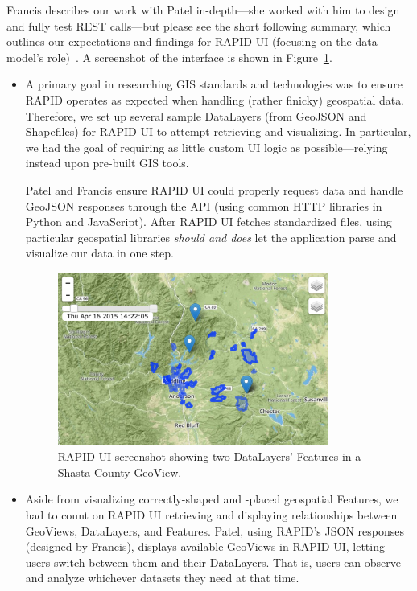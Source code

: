Francis describes our work with Patel in-depth---she worked with him to design and fully test REST calls---but please see the short following summary, which outlines our expectations and findings for RAPID UI (focusing on the data model's role)~\cite{Francis}. A screenshot of the interface is shown in Figure~\ref{fig:rapidui}.

\begin{itemize}
\item A primary goal in researching GIS standards and technologies was to ensure RAPID operates as expected when handling (rather finicky) geospatial data. Therefore, we set up several sample DataLayers (from GeoJSON and Shapefiles) for RAPID UI to attempt retrieving and visualizing. In particular, we had the goal of requiring as little custom UI logic as possible---relying instead upon pre-built GIS tools.

Patel and Francis ensure RAPID UI could properly request data and handle GeoJSON responses through the API (using common HTTP libraries in Python and JavaScript). After RAPID UI fetches standardized files, using particular geospatial libraries \textit{should and does} let the application parse and visualize our data in one step.

\begin{figure}[ht]
    \centering
    \includegraphics[width=0.84\textwidth]{figures/rapidui.png}
    \caption{RAPID UI screenshot showing two DataLayers' Features in a Shasta County GeoView.}
    \label{fig:rapidui}
\end{figure}

\item Aside from visualizing correctly-shaped and -placed geospatial Features, we had to count on RAPID UI retrieving and displaying relationships between GeoViews, DataLayers, and Features. Patel, using RAPID's JSON responses (designed by Francis), displays available GeoViews in RAPID UI, letting users switch between them and their DataLayers. That is, users can observe and analyze whichever datasets they need at that time.


\end{itemize}
